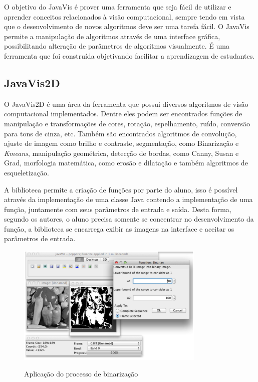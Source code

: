 \documentclass[
	12pt,				%
	oneside,			%
	a4paper,			%
	english,			%
	french,				%
	spanish,			%
	brazil,				%
	]{abntex2}
\begin{document}
O objetivo do JavaVis é prover uma ferramenta que seja fácil de utilizar e aprender conceitos relacionados à visão computacional, sempre tendo em vista que o desenvolvimento de novos algoritmos deve ser uma tarefa fácil. O JavaVis permite a manipulação de algoritmos através de uma interface gráfica, possibilitando alteração de parâmetros de algoritmos visualmente. É uma ferramenta que foi construída objetivando facilitar a aprendizagem de estudantes.

\subsection{JavaVis2D}

O JavaVis2D é uma área da ferramenta que possui diversos algoritmos de visão computacional implementados. Dentre eles podem ser encontrados funções de manipulação e transformações de cores,  rotação, espelhamento, ruído, conversão para tons de cinza, etc. Também são encontrados algoritmos de convolução, ajuste de imagem como brilho e contraste, segmentação, como Binarização e \textit{Kmeans}, manipulação geométrica, detecção de bordas, como Canny, Susan e Grad, morfologia matemática, como erosão e dilatação e também algoritmos de esqueletização. 

A biblioteca permite a criação de funções por parte do aluno, isso é possível através da implementação de uma classe Java contendo a implementação de uma função, juntamente com seus parâmetros de entrada e saída. Desta forma, segundo os autores, o aluno precisa somente se concentrar no desenvolvimento da função, a biblioteca se encarrega exibir as imagens na interface e aceitar os parâmetros de entrada.

\begin{figure}[ht]
\centering
\caption{Aplicação do processo de binarização }
\includegraphics[width=0.8\textwidth]{imagens/javavis_2d.png}
\label{fig:javavis_2d}
\end{figure}
\end{document}
